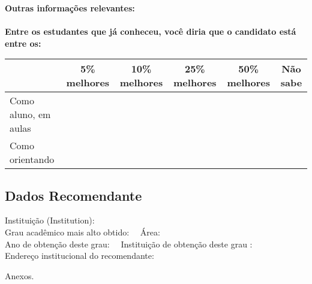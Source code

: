\documentclass[11pt]{article}
\begin{document}
\\\\ 
\\
\textbf{Outras informações relevantes:} \\
\\[0.3cm]
\textbf{Entre os estudantes que já conheceu, você diria que o candidato está entre os:}
\\
\begin{tabular}{|l|c|c|c|c|c|}
\hline
 & 5\% melhores & 10\% melhores & 25\% melhores & 50\% melhores & Não sabe \\
\hline
Como aluno, em aulas &  &  &  &  & \\
\hline
Como orientando &  &  &  &  & \\
\hline
\end{tabular}
\subsection*{Dados Recomendante} 
	Instituição (Institution): 
\\ 
	Grau acadêmico mais alto obtido: 
	\ \ Área: 
	\\
	Ano de obtenção deste grau: 
	\ \ 
	Instituição de obtenção deste grau : 
	\\ 
	Endereço institucional do recomendante: \\  
\begin{center}
Anexos.
\end{center}
\end{document}
